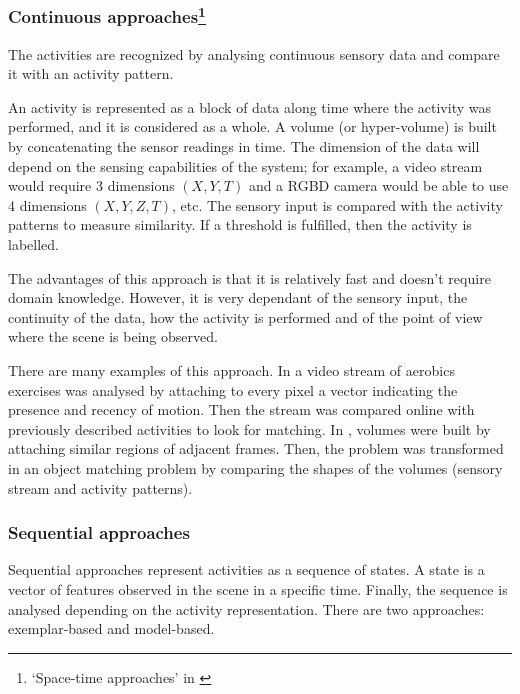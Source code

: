 \subsubsection{Continuous approaches\footnote{`Space-time approaches' in \citep{Aggarwal11_HumanActivity}}} %

The activities are recognized by analysing continuous sensory data and compare it with an activity pattern.

An activity is represented as a block of data along time where the activity was performed, and it is considered as a whole.
A volume (or hyper-volume) is built by concatenating the sensor readings in time.
The dimension of the data will depend on the sensing capabilities of the system; for example, a video stream would require 3 dimensions $(X,Y,T)$ and a RGBD camera would be able to use 4 dimensions $(X,Y,Z,T)$, etc. %
The sensory input is compared with the activity patterns to measure similarity.
If a threshold is fulfilled, then the activity is labelled.

The advantages of this approach is that it is relatively fast and doesn't require domain knowledge. 
However, it is very dependant of the sensory input, the continuity of the data, how the activity is performed and of the point of view where the scene is being observed. %

There are many examples of this approach.
In \citep{Bobick2001_RecHuMovTemp} a video stream of aerobics exercises was analysed by attaching to every pixel a vector indicating the presence and recency of motion. 
Then the stream was compared online with previously described activities to look for matching. 
In \citep{Ke2007_SpTmpShapeAR}, volumes were built by attaching similar regions of adjacent frames.
Then, the problem was transformed in an object matching problem by comparing the shapes of the volumes (sensory stream and activity patterns).

\subsubsection{Sequential approaches} %

Sequential approaches represent activities as a sequence of states. 
A state is a vector of features observed in the scene in a specific time.
Finally, the sequence is analysed depending on the activity representation.
There are two approaches: exemplar-based and model-based.

